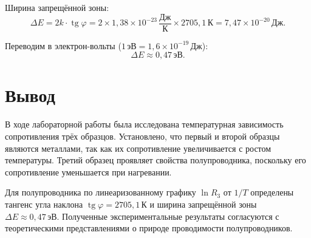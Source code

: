 \documentclass[a4paper,14pt]{extarticle}
\begin{document}
Ширина запрещённой зоны:
\[
\Delta E = 2k \cdot \operatorname{tg}\varphi = 2 \times 1{,}38 \times 10^{-23}\,\frac{\text{Дж}}{\text{К}}
           \times 2705{,}1\,\text{К}
         = 7{,}47 \times 10^{-20}\,\text{Дж}.
\]

Переводим в электрон-вольты ($1\,\text{эВ} = 1{,}6 \times 10^{-19}\,\text{Дж}$):
\[
\boxed{\Delta E \approx 0{,}47\,\text{эВ}.}
\]

\section*{Вывод}

В ходе лабораторной работы была исследована температурная зависимость сопротивления
трёх образцов. Установлено, что первый и второй образцы являются металлами, так как
их сопротивление увеличивается с ростом температуры. Третий образец проявляет
свойства полупроводника, поскольку его сопротивление уменьшается при нагревании.

Для полупроводника по линеаризованному графику $\ln R_3$ от $1/T$ определены
тангенс угла наклона $\operatorname{tg}\varphi = 2705{,}1\,\text{К}$ и ширина
запрещённой зоны $\Delta E \approx 0{,}47\,\text{эВ}$.
Полученные экспериментальные результаты согласуются с теоретическими представлениями
о природе проводимости полупроводников.
\end{document}
